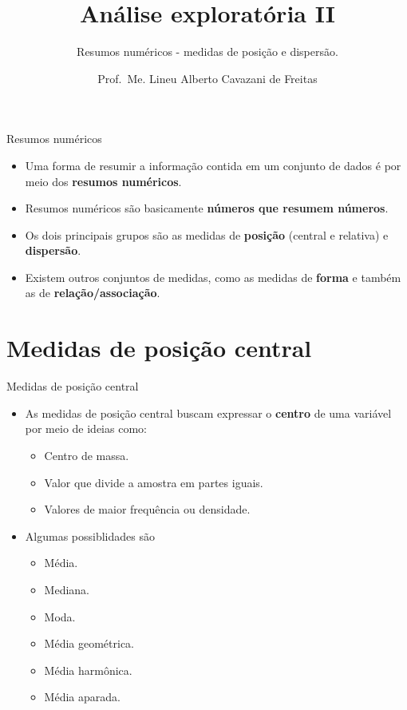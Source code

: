 \documentclass[
  ignorenonframetext,
  serif,
  professionalfont,
  usenames,
  dvipsnames,
  aspectratio = 169]{beamer}
\title{\textbf{Análise exploratória II}}
\subtitle{Resumos numéricos - medidas de posição e dispersão.}
\author{Prof.~Me. Lineu Alberto Cavazani de Freitas}
\date{}
\institute{\textbf{CE003 – Estatística II}\\
\strut \\
Departamento de Estatística\\
Laboratório de Estatística e Geoinformação}
\providecommand{\tightlist}{%
  \setlength{\itemsep}{0pt}\setlength{\parskip}{0pt}}
\renewcommand{\tightlist}{%
  \setlength{\itemsep}{0\baselineskip}
  \setlength{\parskip}{0.25\baselineskip}
}
\def\beginAHalfColumn{\begin{minipage}{0.49\textwidth}}%
\def\endColumns{\end{minipage}}%
\begin{document}
\frame{\titlepage}

\begin{frame}{Resumos numéricos}
\protect\hypertarget{resumos-numuxe9ricos}{}
\begin{itemize}
\item
  Uma forma de resumir a informação contida em um conjunto de dados é
  por meio dos \textbf{resumos numéricos}.
\item
  Resumos numéricos são basicamente
  \textbf{números que resumem números}.
\item
  Os dois principais grupos são as medidas de \textbf{posição} (central
  e relativa) e \textbf{dispersão}.
\item
  Existem outros conjuntos de medidas, como as medidas de \textbf{forma}
  e também as de \textbf{relação/associação}.
\end{itemize}
\end{frame}

\hypertarget{medidas-de-posiuxe7uxe3o-central}{%
\section{Medidas de posição
central}\label{medidas-de-posiuxe7uxe3o-central}}

\begin{frame}{Medidas de posição central}
\protect\hypertarget{medidas-de-posiuxe7uxe3o-central-1}{}
\beginAHalfColumn

\begin{itemize}
\tightlist
\item
  As medidas de posição central buscam expressar o \textbf{centro} de
  uma variável por meio de ideias como:

  \begin{itemize}
  \tightlist
  \item
    Centro de massa.
  \item
    Valor que divide a amostra em partes iguais.
  \item
    Valores de maior frequência ou densidade.
  \end{itemize}
\end{itemize}

\endColumns
\beginAHalfColumn

\begin{itemize}
\tightlist
\item
  Algumas possiblidades são

  \begin{itemize}
  \tightlist
  \item
    Média.
  \item
    Mediana.
  \item
    Moda.
  \item
    Média geométrica.
  \item
    Média harmônica.
  \item
    Média aparada.
  \end{itemize}
\end{itemize}

\endColumns
\end{frame}
\end{document}
